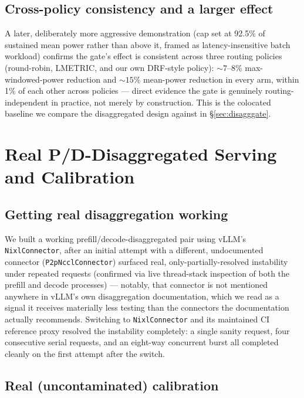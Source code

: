 \documentclass[sigconf,review,anonymous]{acmart}
\begin{document}
\subsection{Cross-policy consistency and a larger effect}
\label{sec:crosspolicy}

A later, deliberately more aggressive demonstration (cap set at 92.5\% of sustained mean
power rather than above it, framed as latency-insensitive batch workload) confirms the
gate's effect is consistent across three routing policies (round-robin, LMETRIC, and our own
DRF-style policy): ${\sim}7$--8\% max-windowed-power reduction and ${\sim}15\%$ mean-power
reduction in every arm, within 1\% of each other across policies --- direct evidence the gate
is genuinely routing-independent in practice, not merely by construction. This is the
colocated baseline we compare the disaggregated design against in \S\ref{sec:disagggate}.

\section{Real P/D-Disaggregated Serving and Calibration}
\label{sec:disaggcalib}

\subsection{Getting real disaggregation working}

We built a working prefill/decode-disaggregated pair using vLLM's \texttt{NixlConnector},
after an initial attempt with a different, undocumented connector (\texttt{P2pNcclConnector})
surfaced real, only-partially-resolved instability under repeated requests (confirmed via
live thread-stack inspection of both the prefill and decode processes) --- notably, that
connector is not mentioned anywhere in vLLM's own disaggregation documentation, which we read
as a signal it receives materially less testing than the connectors the documentation
actually recommends. Switching to \texttt{NixlConnector} and its maintained CI reference
proxy resolved the instability completely: a single sanity request, four consecutive serial
requests, and an eight-way concurrent burst all completed cleanly on the first attempt after
the switch.

\subsection{Real (uncontaminated) calibration}
\label{sec:realcalib}
\end{document}
